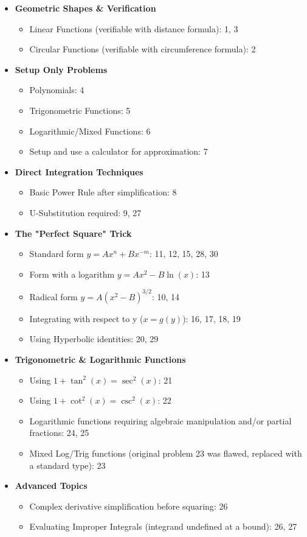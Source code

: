 \documentclass[12pt]{article}
\begin{document}
\begin{itemize}
    \item \textbf{Geometric Shapes \& Verification}
    \begin{itemize}
        \item Linear Functions (verifiable with distance formula): 1, 3
        \item Circular Functions (verifiable with circumference formula): 2
    \end{itemize}
    \item \textbf{Setup Only Problems}
    \begin{itemize}
        \item Polynomials: 4
        \item Trigonometric Functions: 5
        \item Logarithmic/Mixed Functions: 6
        \item Setup and use a calculator for approximation: 7
    \end{itemize}
    \item \textbf{Direct Integration Techniques}
    \begin{itemize}
        \item Basic Power Rule after simplification: 8
        \item U-Substitution required: 9, 27
    \end{itemize}
    \item \textbf{The "Perfect Square" Trick}
    \begin{itemize}
        \item Standard form $y = Ax^n + Bx^{-m}$: 11, 12, 15, 28, 30
        \item Form with a logarithm $y = Ax^2 - B\ln(x)$: 13
        \item Radical form $y = A(x^2-B)^{3/2}$: 10, 14
        \item Integrating with respect to y ($x=g(y)$): 16, 17, 18, 19
        \item Using Hyperbolic identities: 20, 29
    \end{itemize}
    \item \textbf{Trigonometric \& Logarithmic Functions}
    \begin{itemize}
        \item Using $1+\tan^2(x)=\sec^2(x)$: 21
        \item Using $1+\cot^2(x)=\csc^2(x)$: 22
        \item Logarithmic functions requiring algebraic manipulation and/or partial fractions: 24, 25
        \item Mixed Log/Trig functions (original problem 23 was flawed, replaced with a standard type): 23
    \end{itemize}
    \item \textbf{Advanced Topics}
    \begin{itemize}
        \item Complex derivative simplification before squaring: 26
        \item Evaluating Improper Integrals (integrand undefined at a bound): 26, 27
    \end{itemize}
\end{itemize}
\end{document}
